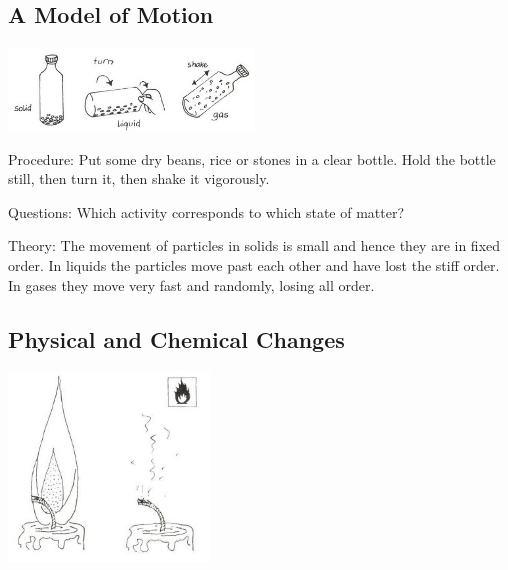\begin{multicols}{2}
\subsection{A Model of Motion}

\begin{center}
\includegraphics[width=0.49\textwidth]{./img/vso/motion-model.jpg}
\end{center}

\begin{description*}
\item[Procedure:]{Put some dry beans, rice or stones in a clear bottle. Hold the bottle still, then turn it, then shake it vigorously.}
\item[Questions:]{Which activity corresponds to which state of matter?}
\item[Theory:]{The movement of particles in solids is small and hence they are in fixed order. In liquids the particles move past each other and have lost the stiff order. In gases they move very fast and randomly, losing all order.}
\end{description*}

\subsection{Physical and Chemical Changes}

\begin{center}
\includegraphics[width=0.4\textwidth]{./img/source/physical-change.jpg}
\end{center}


\end{multicols}
